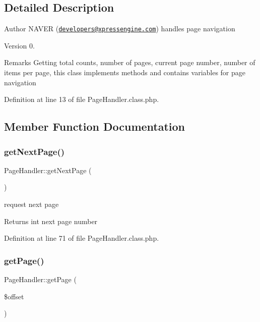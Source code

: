 \subsection{Detailed Description}
\begin{DoxyAuthor}{Author}
N\+A\+V\+ER (\href{mailto:developers@xpressengine.com}{\tt developers@xpressengine.\+com}) handles page navigation 
\end{DoxyAuthor}
\begin{DoxyVersion}{Version}
0.
\end{DoxyVersion}
\begin{DoxyRemark}{Remarks}
Getting total counts, number of pages, current page number, number of items per page, this class implements methods and contains variables for page navigation 
\end{DoxyRemark}


Definition at line 13 of file Page\+Handler.\+class.\+php.



\subsection{Member Function Documentation}
\mbox{\label{classPageHandler_a259d01838d005d854d4cc263ba524de7}} 
\subsubsection{\texorpdfstring{get\+Next\+Page()}{getNextPage()}}
{\footnotesize\ttfamily Page\+Handler\+::get\+Next\+Page (\begin{DoxyParamCaption}{ }\end{DoxyParamCaption})}

request next page \begin{DoxyReturn}{Returns}
int next page number 
\end{DoxyReturn}


Definition at line 71 of file Page\+Handler.\+class.\+php.

\mbox{\label{classPageHandler_a971f178609a0dd6e1a0fd07daa94782d}} 
\subsubsection{\texorpdfstring{get\+Page()}{getPage()}}
{\footnotesize\ttfamily Page\+Handler\+::get\+Page (\begin{DoxyParamCaption}\item[{}]{\$offset }\end{DoxyParamCaption})}

